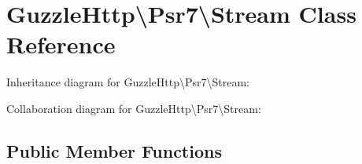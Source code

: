 \hypertarget{classGuzzleHttp_1_1Psr7_1_1Stream}{}\section{Guzzle\+Http\textbackslash{}Psr7\textbackslash{}Stream Class Reference}
\label{classGuzzleHttp_1_1Psr7_1_1Stream}


Inheritance diagram for Guzzle\+Http\textbackslash{}Psr7\textbackslash{}Stream\+:


Collaboration diagram for Guzzle\+Http\textbackslash{}Psr7\textbackslash{}Stream\+:
\subsection*{Public Member Functions}
